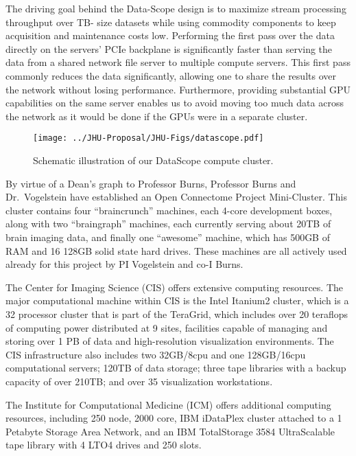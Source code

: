 The driving goal behind the Data-Scope design is to maximize stream processing throughput over TB- size datasets while using commodity components to keep acquisition and maintenance costs low. Performing the first pass over the data directly on the servers' PCIe backplane is significantly faster than serving the data from a shared network file server to multiple compute servers. This first pass commonly reduces the data significantly, allowing one to share the results over the network without losing performance. Furthermore, providing substantial GPU capabilities on the same server enables us to avoid moving too much data across the network as it would be done if the GPUs were in a separate cluster.

\begin{figure}[h!]
\centering
\texttt{[image: ../JHU-Proposal/JHU-Figs/datascope.pdf]}
\caption[Datascope.]{Schematic illustration of our DataScope compute cluster.}
\label{fig:orgchat}
\end{figure}


% 
By virtue of a Dean's graph to Professor Burns, Professor Burns and Dr.~Vogelstein have established an Open Connectome Project Mini-Cluster.  This cluster contains four ``braincrunch'' machines, each 4-core development boxes, along with two ``braingraph'' machines, each currently serving about 20TB of brain imaging data, and finally one ``awesome'' machine, which has 500GB of RAM and 16 128GB solid state hard drives.  These machines are all actively used already for this project by PI Vogelstein and co-I Burns.



% 
The Center for Imaging Science (CIS) offers extensive computing resources. The major computational machine within CIS is the Intel Itanium2 cluster, which is a 32 processor cluster that is part of the TeraGrid, which includes over 20 teraflops of computing power distributed at 9 sites, facilities capable of managing and storing over 1 PB of data and high-resolution visualization environments. The CIS infrastructure also includes two 32GB/8cpu and one 128GB/16cpu computational servers; 120TB of data storage; three tape libraries with a backup capacity of over 210TB; and over 35 visualization workstations.

% 
The Institute for Computational Medicine (ICM) offers additional computing resources, including 250 node, 2000 core, IBM iDataPlex cluster attached to a 1 Petabyte Storage Area Network, and an IBM TotalStorage 3584 UltraScalable tape library with 4 LTO4 drives and 250 slots.
